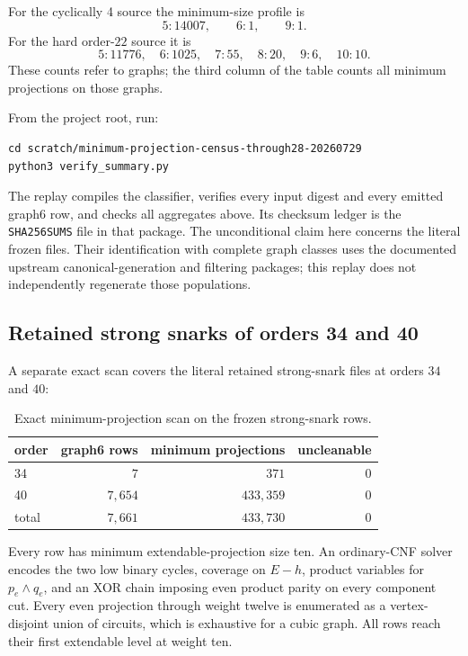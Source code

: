 \documentclass[11pt]{article}
\theoremstyle{definition}
\theoremstyle{remark}
\begin{document}
For the cyclically 4 source the minimum-size profile is
\[
                       5:14007,\qquad 6:1,\qquad 9:1.
\]
For the hard order-\(22\) source it is
\[
 5:11776,\quad 6:1025,\quad 7:55,\quad 8:20,\quad 9:6,\quad 10:10.
\]
These counts refer to graphs; the third column of the table counts all
minimum projections on those graphs.

From the project root, run:
\begin{verbatim}
cd scratch/minimum-projection-census-through28-20260729
python3 verify_summary.py
\end{verbatim}
The replay compiles the classifier, verifies every input digest and every
emitted graph6 row, and checks all aggregates above.  Its checksum ledger is
the \texttt{SHA256SUMS} file in that package.
The unconditional claim here concerns the literal frozen files.  Their
identification with complete graph classes uses the documented upstream
canonical-generation and filtering packages; this replay does not
independently regenerate those populations.

\subsection{Retained strong snarks of orders 34 and 40}

A separate exact scan covers the literal retained strong-snark files at
orders \(34\) and \(40\):
\begin{table}[h]
\centering
\begin{tabular}{lrrr}
\toprule
order & graph6 rows & minimum projections & uncleanable\\
\midrule
34 & \(7\) & \(371\) & \(0\)\\
40 & \(7{,}654\) & \(433{,}359\) & \(0\)\\
\midrule
total & \(7{,}661\) & \(433{,}730\) & \(0\)\\
\bottomrule
\end{tabular}
\caption{Exact minimum-projection scan on the frozen strong-snark rows.}
\end{table}
Every row has minimum extendable-projection size ten.  An ordinary-CNF
solver encodes the two low binary cycles, coverage on \(E-h\), product
variables for \(p_e\wedge q_e\), and an XOR chain imposing even product
parity on every component cut.  Every even projection through weight
twelve is enumerated as a vertex-disjoint union of circuits, which is
exhaustive for a cubic graph.  All rows reach their first extendable level
at weight ten.
\end{document}
